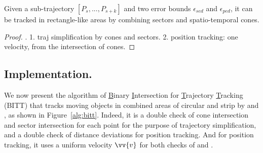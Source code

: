 \begin{theorem}
	\label{theo-binary}
	Given a sub-trajectory $[P_s,...,P_{s+k}]$ and two error bounds $\epsilon_{sed}$ and $\epsilon_{ped}$, it can be tracked in rectangle-like areas by combining sectors and spatio-temporal cones.
\end{theorem}

\begin{proof}
	\todo.
	1. traj simplification by cones and sectors.
	2. position tracking: one velocity, from the intersection of cones.
\end{proof}




\subsection{Implementation.}
We now present the algorithm of \underline{B}inary \underline{I}ntersection for \underline{T}rajectory \underline{T}racking (BITT) that tracks moving objects in combined areas of circular and strip by \sed and \ped, as shown in Figure~\ref{alg:bitt}. 
%
Indeed, it is a double check of cone intersection and sector intersection for each point for the purpose of trajectory simplification, and a double check of distance deviations for position tracking. And for position tracking, it uses a uniform velocity $\vv{v}$ for both checks of \sed and \ped. %

